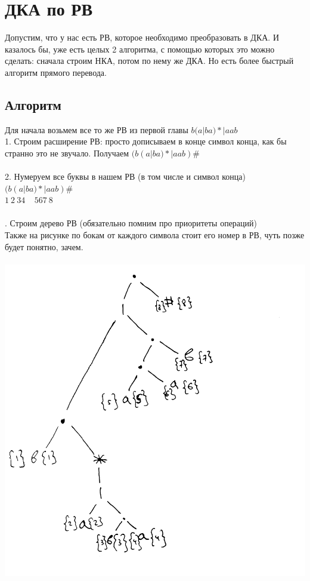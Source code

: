 \documentclass[14pt]{extreport}
\begin{document}
	\chapter{ДКА по РВ}
	Допустим, что у нас есть РВ, которое необходимо преобразовать в ДКА. И казалось бы, уже есть
	целых 2 алгоритма, с помощью которых это можно сделать: сначала строим НКА, потом по нему же
	ДКА. Но есть более быстрый алгоритм прямого перевода.
	\section{Алгоритм}
	Для начала возьмем все то же РВ из первой главы $b(a|ba)*|aab$\\
	1. Строим расширение РВ: просто дописываем в конце символ конца, как бы странно
	это не звучало. Получаем $(b(a|ba)*|aab)\#$\\\\
	2. Нумеруем все буквы в нашем РВ (в том числе и символ конца)\\
	$(b(a|ba)*|aab)\#$\\
	\hspace*{5pt}$1\ 2\ 34\ \ \ \ \ 567\ 8$\\\\
	. Строим дерево РВ (обязательно помним про приоритеты операций)\\
	Также на рисунке по бокам от каждого символа стоит его номер в РВ, чуть позже
	будет понятно, зачем.\\\\
	\includegraphics[scale=0.13]{data/pic3_1.png}\\
\end{document}
